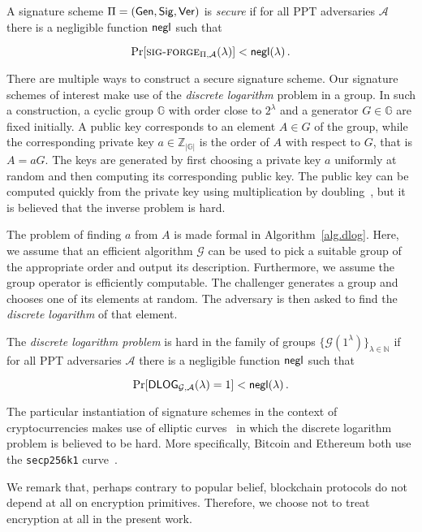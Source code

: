 

\begin{definition}[Security]
  A signature scheme $\Pi = (\mathsf{Gen}, \mathsf{Sig}, \mathsf{Ver})$ is \emph{secure} if for all PPT adversaries $\mathcal{A}$ there is a negligible function $\mathsf{negl}$ such that

  \[
  \Pr[\textsc{sig-forge}_{\Pi,\mathcal{A}}(\lambda)] < \mathsf{negl}(\lambda)\,.
  \]
\end{definition}

There are multiple ways to construct a secure signature scheme. Our signature schemes of interest make use of the \emph{discrete logarithm} problem in a group. In such a construction, a cyclic group $\mathbb{G}$ with order close to $2^\lambda$ and a generator $G \in \mathbb{G}$ are fixed initially. A public key corresponds to an element $A \in G$ of the group, while the corresponding private key $a \in \mathbb{Z}_{|\mathbb{G}|}$ is the order of $A$ with respect to $G$, that is $A = aG$. The keys are generated by first choosing a private key $a$ uniformly at random and then computing its corresponding public key. The public key can be computed quickly from the private key using multiplication by doubling~\cite{shoup}, but it is believed that the inverse problem is hard.

The problem of finding $a$ from $A$ is made formal in Algorithm~\ref{alg.dlog}. Here, we assume that an efficient algorithm $\mathcal{G}$ can be used to pick a suitable group of the appropriate order and output its description. Furthermore, we assume the group operator is efficiently computable. The challenger generates a group and chooses one of its elements at random. The adversary is then asked to find the \emph{discrete logarithm} of that element.



\begin{definition}
  The \emph{discrete logarithm problem} is hard in the family of groups $\{\mathcal{G}(1^\lambda)\}_{\lambda \in \mathbb{N}}$ if for all PPT adversaries $\mathcal{A}$ there is a negligible function $\mathsf{negl}$ such that

  \[
    \Pr[\textsf{DLOG}_{\mathcal{G},\mathcal{A}}(\lambda) = 1] < \mathsf{negl}(\lambda)\,.
  \]
\end{definition}

The particular instantiation of signature schemes in the context of
cryptocurrencies makes use of elliptic curves~\cite{ec} in which the discrete logarithm problem is believed to be hard. More specifically, Bitcoin
and Ethereum both use the \texttt{secp256k1} curve~\cite{secp256k1}.

\begin{remark}
We remark that, perhaps contrary to popular belief, blockchain protocols
do not depend at all on encryption primitives. Therefore, we choose not to
treat encryption at all in the present work.
\end{remark}
